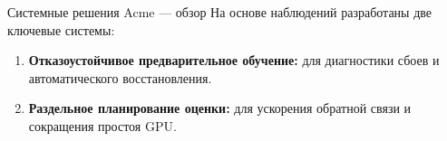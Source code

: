 \begin{frame}{Системные решения Acme — обзор}
	На основе наблюдений разработаны две ключевые системы:
	\begin{enumerate}
		\item \textbf{Отказоустойчивое предварительное обучение:} для диагностики сбоев и автоматического восстановления.
		\item \textbf{Раздельное планирование оценки:} для ускорения обратной связи и сокращения простоя GPU.
	\end{enumerate}
\end{frame}